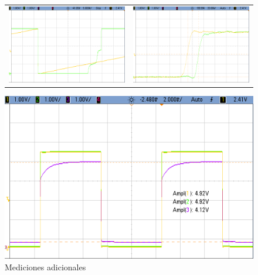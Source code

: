 \begin{figure}[H]
    \centering
        \begin{tabular}{c c}
            \includegraphics[scale=0.2]{../EJ5/Mediciones/Osciloscopio/CONEXION/cropped_triangular_zoom.png} &
            \includegraphics[scale=0.2]{../EJ5/Mediciones/Osciloscopio/CONEXION/cropped_propagacion.png} \\
        \end{tabular}
        \includegraphics[scale=0.2]{../EJ5/Mediciones/Osciloscopio/CONEXION/cropped_carga_capacitiva.png}
    \caption{Mediciones adicionales}
    \label{fig:additional_measures}
\end{figure}

